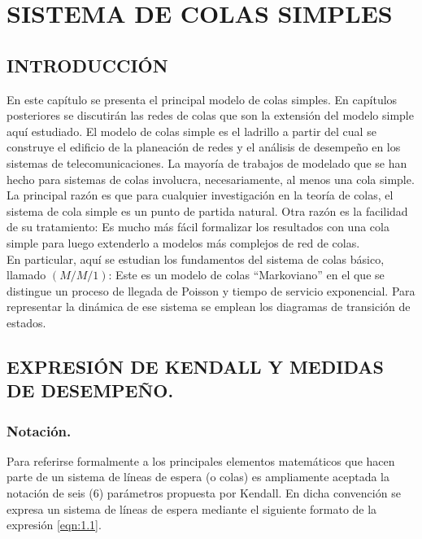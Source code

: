 \chapter{SISTEMA DE COLAS SIMPLES}

\section{INTRODUCCIÓN}\label{intro}
En este capítulo se presenta el principal modelo de colas simples. En capítulos posteriores se
discutirán las redes de colas que son la extensión del modelo simple aquí estudiado. El modelo de
colas simple es el ladrillo a partir del cual se construye el edificio de la planeación de redes y el
análisis de desempeño en los sistemas de telecomunicaciones. La mayoría de trabajos de modelado
que se han hecho para sistemas de colas involucra, necesariamente, al menos una cola simple. La
principal razón es que para cualquier investigación en la teoría de colas, el sistema de cola simple es
un punto de partida natural. Otra razón es la facilidad de su tratamiento: Es mucho más fácil
formalizar los resultados con una cola simple para luego extenderlo a modelos más complejos de
red de colas.
\\
En particular, aquí se estudian los fundamentos del sistema de colas básico, llamado $( M/M/1)$: Este es un modelo de colas “Markoviano” en el que se distingue un proceso de llegada de Poisson y
tiempo de servicio exponencial. Para representar la dinámica de ese sistema se emplean los
diagramas de transición de estados.


\section{EXPRESIÓN DE KENDALL Y MEDIDAS DE DESEMPEÑO.}\label{intro}
\subsection{Notación.}
Para referirse formalmente a los principales elementos matemáticos que hacen parte de un sistema
de líneas de espera (o colas) es ampliamente aceptada la notación de seis (6) parámetros propuesta
por Kendall. En dicha convención se expresa un sistema de líneas de espera mediante el siguiente formato de la expresión \ref{eqn:1.1}.

